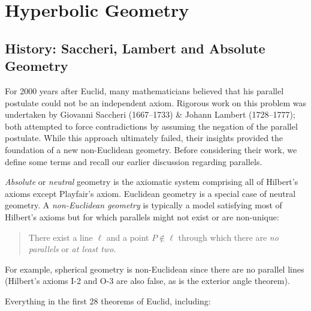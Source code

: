 \graphicspath{{4hyper/asy/}}


\section{Hyperbolic Geometry}\label{chap:hyper}

\subsection{History: Saccheri, Lambert and Absolute Geometry}\label{sec:hyp1}

For 2000 years after Euclid, many mathematicians believed that his parallel postulate could not be an independent axiom. Rigorous work on this problem was undertaken by Giovanni Saccheri (1667--1733) \& Johann Lambert (1728--1777); both attempted to force contradictions by assuming the negation of the parallel postulate. While this approach ultimately failed, their insights provided the foundation of a new non-Euclidean geometry. Before considering their work, we define some terms and recall our earlier discussion regarding parallels.

\begin{defn}{}{}
\emph{Absolute} or \emph{neutral} geometry is the axiomatic system comprising all of Hilbert's axioms except Playfair's axiom. Euclidean geometry is a special case of neutral geometry.\smallbreak
A \emph{non-Euclidean geometry} is typically a model satisfying most of Hilbert's axioms but for which parallels might not exist or are non-unique:
\begin{quote}
There exist a line $\ell$ and a point $P\not\in\ell$ through which there are \emph{no parallels} or \emph{at least two.}
\end{quote}
\end{defn}

For example, spherical geometry is non-Euclidean since there are no parallel lines (Hilbert's axioms I-2 and O-3 are also false, as is the exterior angle theorem).



Everything in the first 28 theorems of Euclid, including:

